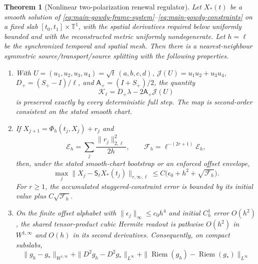 \documentclass[11pt]{article}
\newtheorem{theorem}{Theorem}[section]
\numberwithin{equation}{section}
\theoremstyle{definition}
\theoremstyle{remark}
\begin{document}
\begin{theorem}[Nonlinear two-polarization renewal regulator]
\label{thm:main-gowdy-regulator}
Let $X_*(t)$ be a smooth solution of
\eqref{eq:main-gowdy-frame-system}--\eqref{eq:main-gowdy-constraints} on a fixed
slab $[t_0,t_1]\times\mathbb T^1$, with the spatial derivatives required below
uniformly bounded and with the reconstructed metric uniformly nondegenerate.
Let $h=\ell$ be the synchronized temporal and spatial mesh.  Then there is a
nearest-neighbour symmetric source/transport/source splitting with the following
properties.
\begin{enumerate}[label=\textup{(G\arabic*)},leftmargin=3em]
\item With
      $U=(u_1,u_2,u_3,u_4)=\sqrt t\,(a,b,c,d)$,
      $\mathcal J(U)=u_1u_2+u_3u_4$,
      $D_+=(S_+-I)/\ell$, and $\mathsf A_+=(I+S_+)/2$, the quantity
      \begin{equation}
       \mathcal K_\ell
       =D_+\lambda-2\mathsf A_+\mathcal J(U)
       \label{eq:main-gowdy-staggered-momentum}
      \end{equation}
      is preserved exactly by every deterministic full step.  The map is
      second-order consistent on the stated smooth chart.
\item If
      $X_{j+1}=\Phi_h(t_j,X_j)+r_j$ and
      \begin{equation}
       \mathcal E_h=\sum_j\frac{\|r_j\|_{2,\ell}^2}{2h},\qquad
       \mathcal F_h=\ell^{-(2r+1)}\mathcal E_h,
       \label{eq:main-gowdy-residual-energy}
      \end{equation}
      then, under the stated smooth-chart bootstrap or an enforced offset
      envelope,
      \begin{equation}
       \max_j\|X_j-\mathsf S_\ell X_*(t_j)\|_{r,\infty,\ell}
       \le C\bigl(\epsilon_0+h^2+\sqrt{\mathcal F_h}\bigr).
       \label{eq:main-gowdy-state-error}
      \end{equation}
      For $r\ge1$, the accumulated staggered-constraint error is bounded by its
      initial value plus $C\sqrt{\mathcal F_h}$.
\item On the finite offset alphabet with
      $\|\epsilon_j\|_\infty\le c_0h^4$ and initial $C_h^1$ error $O(h^2)$,
      the shared tensor-product cubic Hermite readout is pathwise $O(h^2)$ in
      $W^{1,\infty}$ and $O(h)$ in its second derivatives.  Consequently, on
      compact subslabs,
      \begin{equation}
       \|g_h-g_*\|_{W^{1,\infty}}
       +\|D^2g_h-D^2g_*\|_{L^\infty}
       +\|\operatorname{Riem}(g_h)-\operatorname{Riem}(g_*)\|_{L^\infty}

\end{equation}
\end{enumerate}
\end{theorem}
\end{document}
